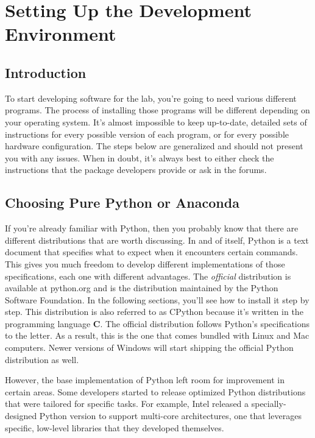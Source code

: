 \chapter[Setting Up]{Setting Up the Development Environment}\label{ch:setting-up}
\section{Introduction}\label{sec:setting-up-introduction}
To start developing software for the lab, you're going to need various different programs. The process of installing those programs will be different depending on your operating system. It's almost impossible to keep up-to-date, detailed sets of instructions for every possible version of each program, or for every possible hardware configuration. The steps below are generalized and should not present you with any issues. When in doubt, it's always best to either check the instructions that the package developers provide or ask in the forums.

\section{Choosing Pure Python or Anaconda}\label{sec:python-or-anaconda}
If you're already familiar with Python, then you probably know that there are different distributions that are worth discussing. In and of itself, Python is a text document that specifies what to expect when it encounters certain commands. This gives you much freedom to develop different implementations of those specifications, each one with different advantages. The \emph{official} distribution is available at python.org and is the distribution maintained by the Python Software Foundation. In the following sections, you'll see how to install it step by step. This distribution is also referred to as CPython because it's written in the programming language \textbf{C}. The official distribution follows Python's specifications to the letter. As a result, this is the one that comes bundled with Linux and Mac computers. Newer versions of Windows will start shipping the official Python distribution as well.

However, the base implementation of Python left room for improvement in certain areas. Some developers started to release optimized Python distributions that were tailored for specific tasks. For example, Intel released a specially-designed Python version to support multi-core architectures, one that leverages specific, low-level libraries that they developed themselves.

